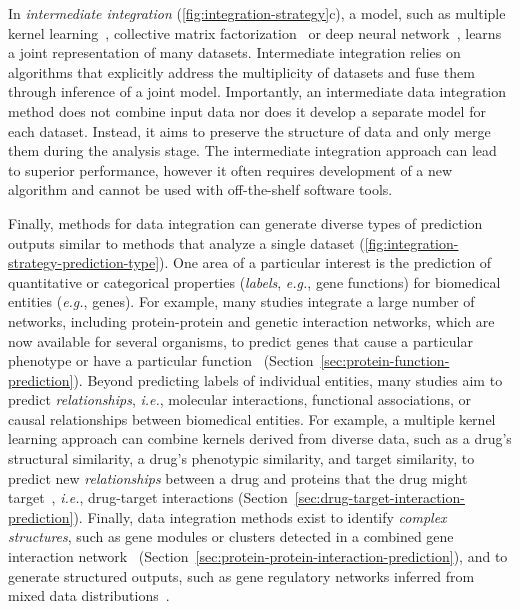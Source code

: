 \documentclass[5p]{elsarticle}
\newcommand{\eg}{\emph{e.g.}\xspace}
\newcommand{\ie}{\emph{i.e.}\xspace}
\newcommand{\rev}[1]{{\color{black}#1}}
\begin{document}
\rev{In {\em intermediate integration} (\autoref{fig:integration-strategy}\rev{c}), a model, such as multiple kernel} learning~\cite{Brayet2014towards,Mariette2017unsupervised}, collective matrix factorization~\cite{Zitnik2014survival,Wang2014similarity,Zitnik2015data} or deep neural network~\cite{Tan2017unsupervised,Zitnik2018polypharmacy}, learns a joint representation of many datasets.
Intermediate integration relies on algorithms \rev{that explicitly address the multiplicity} of datasets and fuse them through inference of a joint model.
Importantly, \rev{an intermediate data integration method} does not combine input data nor does it develop a separate model for each dataset.
Instead, it aims to preserve the structure of data and only merge them during the \rev{analysis} stage.
The intermediate integration approach can lead to superior performance, however it often requires development of a new algorithm and cannot be used with off-the-shelf software tools.

Finally, methods for data integration can generate diverse types of prediction outputs similar to methods that \rev{analyze a single dataset} (\autoref{fig:integration-strategy-prediction-type}).
One area of a particular interest is the prediction \rev{of  quantitative or categorical properties ({\em labels}, \eg, gene functions) for biomedical entities (\eg, genes)}.
For example, many studies \rev{integrate a large number of networks}, including protein-protein and genetic interaction networks, which are now available for several organisms, to predict genes that cause a particular phenotype or have a particular function~\cite{Mostafavi2008genemania,Carreras2017comprehensive} (Section~\ref{sec:protein-function-prediction}).
Beyond predicting labels of individual entities, many studies aim to predict {\em relationships}, \ie, molecular interactions, functional associations, or causal relationships between biomedical entities.
For example, a multiple kernel learning approach can combine kernels derived from diverse data, such as \rev{a} drug's structural similarity, \rev{a} drug's phenotypic similarity, and target similarity, to predict new {\em relationships} between a drug and proteins that the drug might target~\cite{Gonen2012predicting}, \ie, drug-target interactions (Section~\ref{sec:drug-target-interaction-prediction}).
\rev{Finally, data integration methods exist to} identify {\em complex structures}, such as gene modules or clusters detected in \rev{a} combined gene interaction network~\cite{Cowen2017network} (Section~\ref{sec:protein-protein-interaction-prediction}), and to generate structured outputs, such as gene regulatory networks inferred from \rev{mixed data} distributions~\cite{Zitnik2015netinf}.
\end{document}
